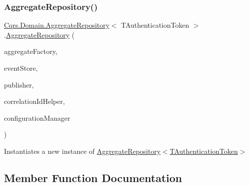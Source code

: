 \subsubsection{\texorpdfstring{Aggregate\+Repository()}{AggregateRepository()}}
{\footnotesize\ttfamily \hyperlink{classCqrs_1_1Domain_1_1AggregateRepository}{Cqrs.\+Domain.\+Aggregate\+Repository}$<$ T\+Authentication\+Token $>$.\hyperlink{classCqrs_1_1Domain_1_1AggregateRepository}{Aggregate\+Repository} (\begin{DoxyParamCaption}\item[{\hyperlink{interfaceCqrs_1_1Domain_1_1Factories_1_1IAggregateFactory}{I\+Aggregate\+Factory}}]{aggregate\+Factory,  }\item[{\hyperlink{interfaceCqrs_1_1Events_1_1IEventStore}{I\+Event\+Store}$<$ T\+Authentication\+Token $>$}]{event\+Store,  }\item[{\hyperlink{interfaceCqrs_1_1Events_1_1IEventPublisher}{I\+Event\+Publisher}$<$ T\+Authentication\+Token $>$}]{publisher,  }\item[{I\+Correlation\+Id\+Helper}]{correlation\+Id\+Helper,  }\item[{\hyperlink{interfaceCqrs_1_1Configuration_1_1IConfigurationManager}{I\+Configuration\+Manager}}]{configuration\+Manager }\end{DoxyParamCaption})}



Instantiates a new instance of \hyperlink{classCqrs_1_1Domain_1_1AggregateRepository_a12a5588533a7eb2cdd061576ad53c8ac_a12a5588533a7eb2cdd061576ad53c8ac}{Aggregate\+Repository$<$\+T\+Authentication\+Token$>$} 



\subsection{Member Function Documentation}
\mbox{\label{classCqrs_1_1Domain_1_1AggregateRepository_a64d82c57bbe49a11bd5cf20c5b86ce19_a64d82c57bbe49a11bd5cf20c5b86ce19}} 
